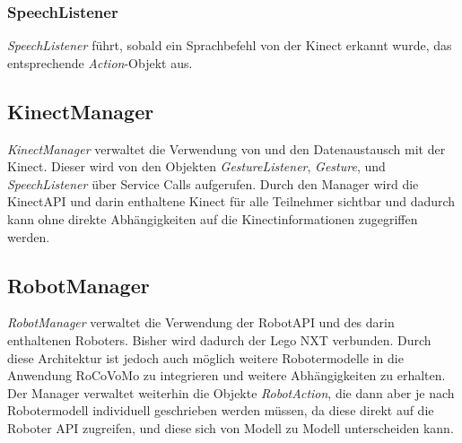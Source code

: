 \subsubsection{SpeechListener}
\textit{SpeechListener} f\"uhrt, sobald ein Sprachbefehl von der Kinect erkannt wurde, das entsprechende \textit{Action}-Objekt aus.

\subsection{KinectManager}
\textit{KinectManager} verwaltet die Verwendung von und den Datenaustausch mit der Kinect. Dieser wird von den Objekten \textit{GestureListener}, \textit{Gesture}, und \textit{SpeechListener} \"uber Service Calls aufgerufen.
\newline
Durch den Manager wird die KinectAPI und darin enthaltene Kinect f\"ur alle Teilnehmer sichtbar und dadurch kann ohne direkte Abh\"angigkeiten auf die Kinectinformationen zugegriffen werden.

\subsection{RobotManager}
\textit{RobotManager} verwaltet die Verwendung der RobotAPI und des darin enthaltenen Roboters. Bisher wird dadurch der Lego NXT verbunden. Durch diese Architektur ist jedoch auch m\"oglich weitere Robotermodelle in die Anwendung RoCoVoMo zu integrieren und weitere Abh\"angigkeiten zu erhalten.
\newline
Der Manager verwaltet weiterhin die Objekte \textit{RobotAction}, die dann aber je nach Robotermodell individuell geschrieben werden m\"ussen, da diese direkt auf die Roboter \gls{API} zugreifen, und diese sich von Modell zu Modell unterscheiden kann.

